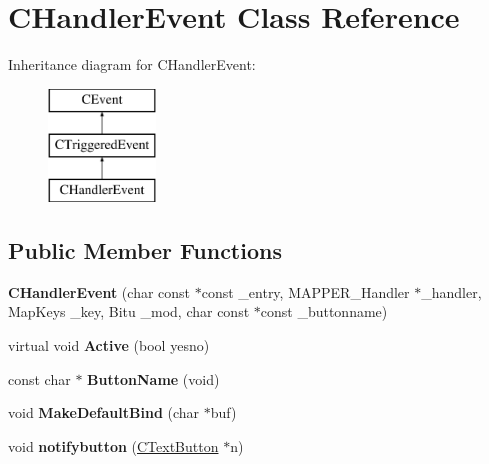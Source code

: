 \hypertarget{classCHandlerEvent}{\section{C\-Handler\-Event Class Reference}
\label{classCHandlerEvent}
}
Inheritance diagram for C\-Handler\-Event\-:\begin{figure}[H]
\begin{center}
\leavevmode
\includegraphics[height=3.000000cm]{classCHandlerEvent}
\end{center}
\end{figure}
\subsection*{Public Member Functions}
\begin{DoxyCompactItemize}
\item 
\hypertarget{classCHandlerEvent_aca304371826b35def368cb051ca7a625}{{\bfseries C\-Handler\-Event} (char const $\ast$const \-\_\-entry, M\-A\-P\-P\-E\-R\-\_\-\-Handler $\ast$\-\_\-handler, Map\-Keys \-\_\-key, Bitu \-\_\-mod, char const $\ast$const \-\_\-buttonname)}\label{classCHandlerEvent_aca304371826b35def368cb051ca7a625}

\item 
\hypertarget{classCHandlerEvent_af4a0835bf174abb23ae9b88c0521e9c8}{virtual void {\bfseries Active} (bool yesno)}\label{classCHandlerEvent_af4a0835bf174abb23ae9b88c0521e9c8}

\item 
\hypertarget{classCHandlerEvent_a58aafd6e482cff4b63507391d424477f}{const char $\ast$ {\bfseries Button\-Name} (void)}\label{classCHandlerEvent_a58aafd6e482cff4b63507391d424477f}

\item 
\hypertarget{classCHandlerEvent_a3062e41266603ad8918a7ca2bba8f095}{void {\bfseries Make\-Default\-Bind} (char $\ast$buf)}\label{classCHandlerEvent_a3062e41266603ad8918a7ca2bba8f095}

\item 
\hypertarget{classCHandlerEvent_a3bd14f3961c29799530602c8e2d5a6fe}{void {\bfseries notifybutton} (\hyperlink{classCTextButton}{C\-Text\-Button} $\ast$n)}\label{classCHandlerEvent_a3bd14f3961c29799530602c8e2d5a6fe}

\end{DoxyCompactItemize}
